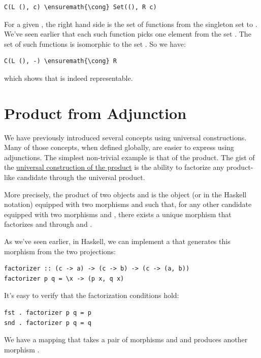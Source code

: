 \begin{Verbatim}[commandchars=\\\{\}]
C(L (), c) \ensuremath{\cong} Set((), R c)
\end{Verbatim}
For a given , the right hand side is the set of functions from
the singleton set \code{()} to . We've seen earlier that
each such function picks one element from the set . The set
of such functions is isomorphic to the set . So we have:

\begin{Verbatim}[commandchars=\\\{\}]
C(L (), -) \ensuremath{\cong} R
\end{Verbatim}
which shows that  is indeed representable.

\section{Product from Adjunction}\label{product-from-adjunction}

We have previously introduced several concepts using universal
constructions. Many of those concepts, when defined globally, are easier
to express using adjunctions. The simplest non-trivial example is that
of the product. The gist of the \hyperref[products-and-coproducts]{universal
construction of the product} is the ability to factorize any
product-like candidate through the universal product.

More precisely, the product of two objects  and  is
the object  (or  in the Haskell
notation) equipped with two morphisms  and  such
that, for any other candidate  equipped with two morphisms
 and , there
exists a unique morphism  that
factorizes  and  through  and
.

As we've seen earlier, in Haskell, we can implement a  that generates this
morphism from the two projections:

\begin{verbatim}
factorizer :: (c -> a) -> (c -> b) -> (c -> (a, b))
factorizer p q = \x -> (p x, q x)
\end{verbatim}
It's easy to verify that the factorization conditions hold:

\begin{verbatim}
fst . factorizer p q = p
snd . factorizer p q = q
\end{verbatim}
We have a mapping that takes a pair of morphisms  and
 and produces another morphism
.

